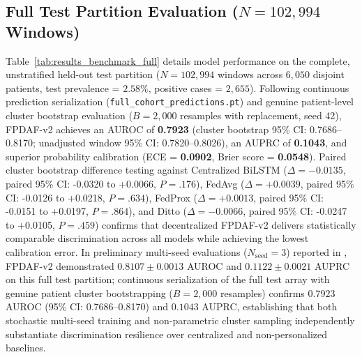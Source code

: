 \documentclass[journal,twocolumn,10pt]{IEEEtran}
\begin{document}
\begin{table}[!t]
\caption*{\footnotesize \textit{Note:} Operating metrics evaluated at default threshold $\tau=0.50$. Unadjusted 95\% CIs are derived via Hanley-McNeil (1982). Cluster bootstrap 95\% CIs are derived via genuine patient-level cluster bootstrap ($B=2,000$ resamples with replacement, seed 42) retaining all trajectory windows per sampled patient encounter. Models are partitioned into Panel A (client-stratified sampling: 5,000 windows per hospital node, 408 positives, prevalence 2.72\%, $M=4,127$ patients) and Panel B (uniform multi-center pooled sampling: 387 positives, prevalence 2.58\%, $M=4,207$ patients). Cross-panel comparisons reflect differing empirical sampling structures and must not be interpreted as direct matched comparisons. ECE = Expected Calibration Error; Brier Score measures probability mean squared error.}
\end{table}

\subsection{Full Test Partition Evaluation ($N=102,994$ Windows)}
Table~\ref{tab:results_benchmark_full} details model performance on the complete, unstratified held-out test partition ($N=102,994$ windows across $6,050$ disjoint patients, test prevalence = $2.58\%$, positive cases = $2,655$). Following continuous prediction serialization (\texttt{full\_cohort\_predictions.pt}) and genuine patient-level cluster bootstrap evaluation ($B=2,000$ resamples with replacement, seed 42), FPDAF-v2 achieves an AUROC of \textbf{0.7923} (cluster bootstrap 95\% CI: 0.7686--0.8170; unadjusted window 95\% CI: 0.7820--0.8026), an AUPRC of \textbf{0.1043}, and superior probability calibration (ECE = \textbf{0.0902}, Brier score = \textbf{0.0548}). Paired cluster bootstrap difference testing against Centralized BiLSTM ($\Delta = -0.0135$, paired 95\% CI: -0.0320 to +0.0066, $P = .176$), FedAvg ($\Delta = +0.0039$, paired 95\% CI: -0.0126 to +0.0218, $P = .634$), FedProx ($\Delta = +0.0013$, paired 95\% CI: -0.0151 to +0.0197, $P = .864$), and Ditto ($\Delta = -0.0066$, paired 95\% CI: -0.0247 to +0.0105, $P = .459$) confirms that decentralized FPDAF-v2 delivers statistically comparable discrimination across all models while achieving the lowest calibration error. In preliminary multi-seed evaluations ($N_{\text{seed}}=3$) reported in \cite{sakhi2026drift}, FPDAF-v2 demonstrated $0.8107 \pm 0.0013$ AUROC and $0.1122 \pm 0.0021$ AUPRC on this full test partition; continuous serialization of the full test array with genuine patient cluster bootstrapping ($B=2,000$ resamples) confirms $0.7923$ AUROC (95\% CI: 0.7686--0.8170) and $0.1043$ AUPRC, establishing that both stochastic multi-seed training and non-parametric cluster sampling independently substantiate discrimination resilience over centralized and non-personalized baselines.
\end{document}
